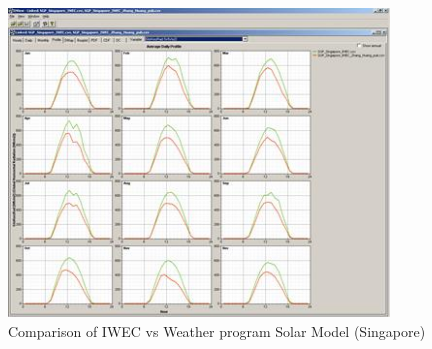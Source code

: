 \begin{figure}[hbtp] %
\centering
\includegraphics[width=0.9\textwidth, height=0.9\textheight, keepaspectratio=true]{media/image007.jpg}
\caption{Comparison of IWEC vs Weather program Solar Model (Singapore) \protect \label{fig:comparison-of-iwec-vs-weather-program-solar}}
\end{figure}
